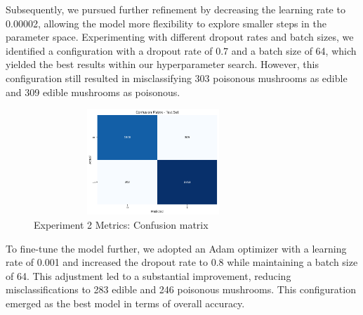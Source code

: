 Subsequently, we pursued further refinement by decreasing the learning rate to 0.00002, allowing the model more flexibility to explore smaller steps in the parameter space. Experimenting with different dropout rates and batch sizes, we identified a configuration with a dropout rate of 0.7 and a batch size of 64, which yielded the best results within our hyperparameter search. However, this configuration still resulted in misclassifying 303 poisonous mushrooms as edible and 309 edible mushrooms as poisonous.

\begin{figure}[h]
    \centering
    \includegraphics[height=4cm, width=9cm]{images/2.cm.png}
    \caption{Experiment 2 Metrics: Confusion matrix}
\end{figure}


To fine-tune the model further, we adopted an Adam optimizer with a learning rate of 0.001 and increased the dropout rate to 0.8 while maintaining a batch size of 64. This adjustment led to a substantial improvement, reducing misclassifications to 283 edible and 246 poisonous mushrooms. This configuration emerged as the best model in terms of overall accuracy.

